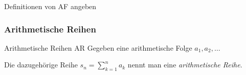 \begin{bsp} {Definitionen von AF angeben}{}
\begin{itemize}
            

        
    \end{itemize}

\end{bsp}
 \clearpage

\subsubsection{Arithmetische Reihen}

\begin{definition}{Arithmetische Reihen AR}{}
Gegeben eine arithmetische Folge $a_1,a_2,\dots $

Die dazugehörige Reihe $s_n =\sum\limits_{k=1}^n a_k$ nennt man eine \emph{arithmetische Reihe}.

\end{definition}

